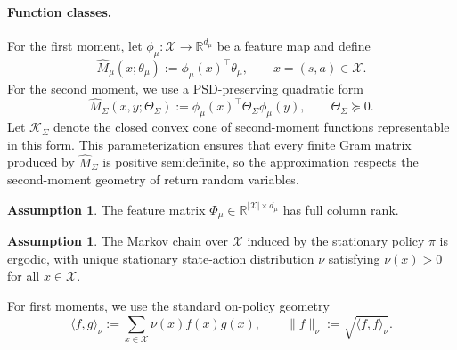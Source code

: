 \documentclass[accepted]{uai2026}
\theoremstyle{plain}
\theoremstyle{definition}
\newtheorem{assumption}[theorem]{Assumption}
\theoremstyle{remark}
\newcommand{\1}{\mathbbm{1}}
\begin{document}
\paragraph{Function classes.}
For the first moment, let $\phi_\mu:\mathcal{X}\to\mathbb{R}^{d_\mu}$ be a feature map and define
\begin{equation}
\hat{M}_\mu(x;\theta_\mu):=\phi_\mu(x)^\top\theta_\mu,\qquad x=(s,a)\in\mathcal{X}.
\end{equation}
For the second moment, we use a PSD-preserving quadratic form
\begin{equation}
\hat{M}_\Sigma(x,y;\Theta_\Sigma) := \phi_\mu(x)^\top\Theta_\Sigma\phi_\mu(y),\qquad \Theta_\Sigma\succeq 0.
\end{equation}
Let $\mathcal{K}_\Sigma$ denote the closed convex cone of second-moment functions representable in this form. This parameterization ensures that every finite Gram matrix produced by $\hat{M}_\Sigma$ is positive semidefinite, so the approximation respects the second-moment geometry of return random variables.

\begin{assumption}\label{ass:rank}
The feature matrix $\Phi_\mu\in\mathbb{R}^{|\mathcal{X}|\times d_\mu}$ has full column rank.
\end{assumption}

\begin{assumption}\label{ass:ergodic}
The Markov chain over $\mathcal{X}$ induced by the stationary policy $\pi$ is ergodic, with unique stationary state-action distribution $\nu$ satisfying $\nu(x)>0$ for all $x\in\mathcal{X}$.
\end{assumption}

For first moments, we use the standard on-policy geometry
\begin{equation}\label{eq:inner1}
\langle f,g\rangle_\nu := \sum_{x\in\mathcal{X}}\nu(x)f(x)g(x), \qquad \|f\|_\nu := \sqrt{\langle f,f\rangle_\nu}.
\end{equation}
\end{document}
